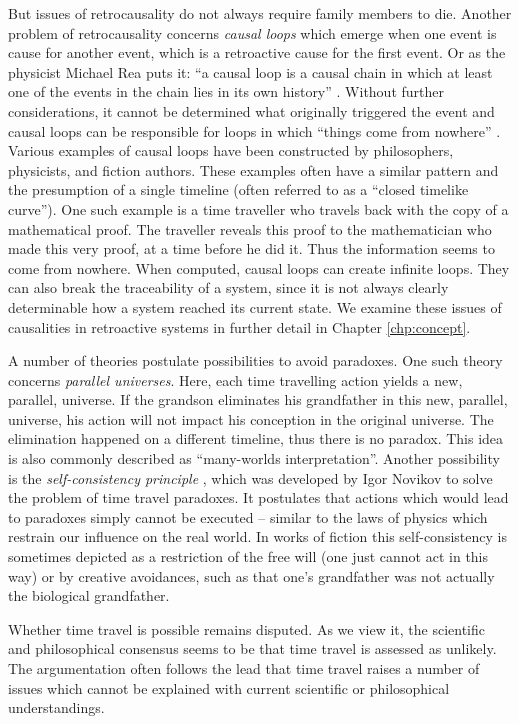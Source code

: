 But issues of retrocausality do not always require family members to die. Another 
problem of retrocausality concerns \emph{causal loops} which emerge when one event 
is cause for another event, which is a retroactive cause for the first event. Or 
as the physicist Michael Rea puts it: ``a causal loop is a causal chain in which 
at least one of the events in the chain lies in its own history'' \cite{Rea2014}.
%
Without further considerations, it cannot be determined what originally triggered 
the event and causal loops can be responsible for loops in which ``things come 
from nowhere'' \cite{Smith2016}.
%
Various examples of causal loops have been constructed by philosophers, physicists, 
and fiction authors. These examples often have a similar pattern and the presumption 
of a single timeline (often referred to as a ``closed timelike curve''). 
One such example is a time traveller who travels back with the copy of a mathematical 
proof. The traveller reveals this proof to the mathematician who made this very proof,
at a time before he did it. Thus the information seems to come from nowhere.
%
When computed, causal loops can create infinite loops. They can also break the 
traceability of a system, since it is not always clearly determinable how a system 
reached its current state.
We examine these issues of causalities in retroactive systems in further 
detail in Chapter \ref{chp:concept}.

A number of theories postulate possibilities to avoid paradoxes. One such theory 
concerns \emph{parallel universes}. Here, each time travelling action yields a new, 
parallel, universe. If the grandson eliminates his grandfather in this new, parallel, 
universe, his action will not impact his conception in the original universe. 
The elimination happened on a different timeline, thus there is no paradox.
This idea is also commonly described as ``many-worlds interpretation''.
Another possibility is the \emph{self-consistency principle} \cite[p.607]{Frolov1998}, 
which was developed by Igor Novikov to solve the problem of time travel paradoxes.
It postulates that actions which would lead to paradoxes simply cannot be 
executed -- similar to the laws of physics which restrain our influence on 
the real world.
In works of fiction this self-consistency is sometimes depicted as a restriction
of the free will (one just cannot act in this way) or by creative avoidances, such
as that one's grandfather was not actually the biological grandfather.

Whether time travel is possible remains disputed. As we view it, the scientific 
and philosophical consensus seems to be that time travel is assessed as unlikely. 
The argumentation often follows the lead that time travel raises a number of issues 
which cannot be explained with current scientific or philosophical understandings.


